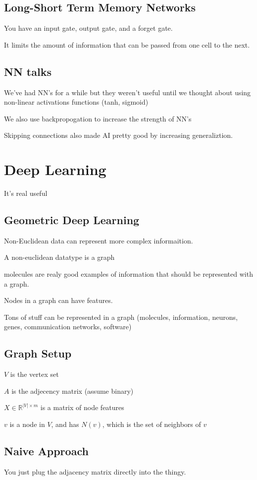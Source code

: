 \documentclass[fleqn]{report}
\begin{document}
\section{Long-Short Term Memory Networks}
You have an input gate, output gate, and a forget gate. 

It limits the amount of information that can be passed from one 
cell to the next. 

\section{NN talks}
We've had NN's for a while but they weren't useful until we thought about 
using non-linear activations functions (tanh, sigmoid)

We also use backpropogation to increase the strength of NN's

Skipping connections also made AI pretty good by increasing 
generaliztion. 

\chapter{Deep Learning}
It's real useful 

\section{Geometric Deep Learning}
Non-Euclidean data can represent more complex informaition. 

A non-euclidean datatype is a graph 

molecules are realy good examples of information that should be represented 
with a graph.

Nodes in a graph can have features. 

Tons of stuff can be represented in a graph (molecules, information, neurons, 
genes, communication networks, software)

\section{Graph Setup}
$V$ is the vertex set 

$A$ is the adjecency matrix (assume binary) 

$X \in \mathbb{R}^{|V| \times m}$ is a matrix of node features 

$v$ is a node in $V$, and has $N(v)$, which is the set of neighbors of $v$

\section{Naive Approach}
You just plug the adjacency matrix directly into the thingy.
\end{document}
